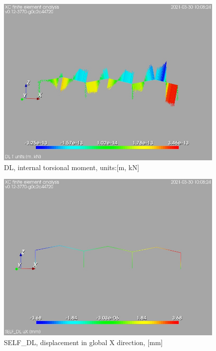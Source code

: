 \begin{figure}
\begin{center}
\includegraphics[width=\linewidth]{calc_results/sole_zeinali/text/graphics/resSimplLC/DLallMemberSetT}
\caption{DL, internal torsional moment, units:[m, kN]}
\end{center}
\end{figure}
\cleardoublepage
\begin{figure}
\begin{center}
\includegraphics[width=\linewidth]{calc_results/sole_zeinali/text/graphics/resSimplLC/SELF_DLtotaluX}
\caption{SELF_DL, displacement in global X direction, [mm]}
\end{center}
\end{figure}
